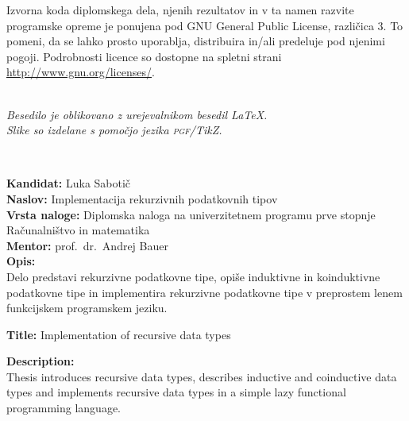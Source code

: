 \documentclass[12pt,a4paper,openany]{book}
\newcommand{\pgfname}{\textsc{pgf}}
\newcommand{\tikzname}{Ti\emph{k}Z}
\begin{document}
\vspace*{1.5cm}
{\small \noindent
Izvorna koda diplomskega dela, njenih rezultatov in v ta namen razvite programske opreme je ponujena pod GNU General Public License,
različica 3. To pomeni, da se lahko prosto uporablja, distribuira in/ali predeluje pod njenimi pogoji.
Podrobnosti licence so dostopne na spletni strani \url{http://www.gnu.org/licenses/}.
}

\begin{center} 
\ \\ \vfill
{\em
Besedilo je oblikovano z urejevalnikom besedil \LaTeX. \\ Slike so izdelane s pomočjo jezika \pgfname/\tikzname.}
\end{center}

\newpage


\thispagestyle{empty}
\
\vfill

\bigskip
\noindent\textbf{Kandidat:} Luka Sabotič\\
\noindent\textbf{Naslov:} Implementacija rekurzivnih podatkovnih tipov\\
\noindent\textbf{Vrsta naloge:} Diplomska naloga na univerzitetnem programu prve stopnje Računalništvo in matematika \\
\noindent\textbf{Mentor:} prof.\ dr.\ Andrej Bauer\\

\bigskip
\noindent\textbf{Opis:}\\
Delo predstavi rekurzivne podatkovne tipe, opiše induktivne in koinduktivne podatkovne tipe in implementira rekurzivne podatkovne tipe v preprostem lenem funkcijskem programskem jeziku.

\bigskip
\noindent\textbf{Title:} Implementation of recursive data types

\bigskip
\noindent\textbf{Description:}\\
Thesis introduces recursive data types, describes inductive and coinductive data types and implements recursive data types in a simple lazy functional programming language.

\vfill



\vspace{2cm}
\newpage

\end{document}
